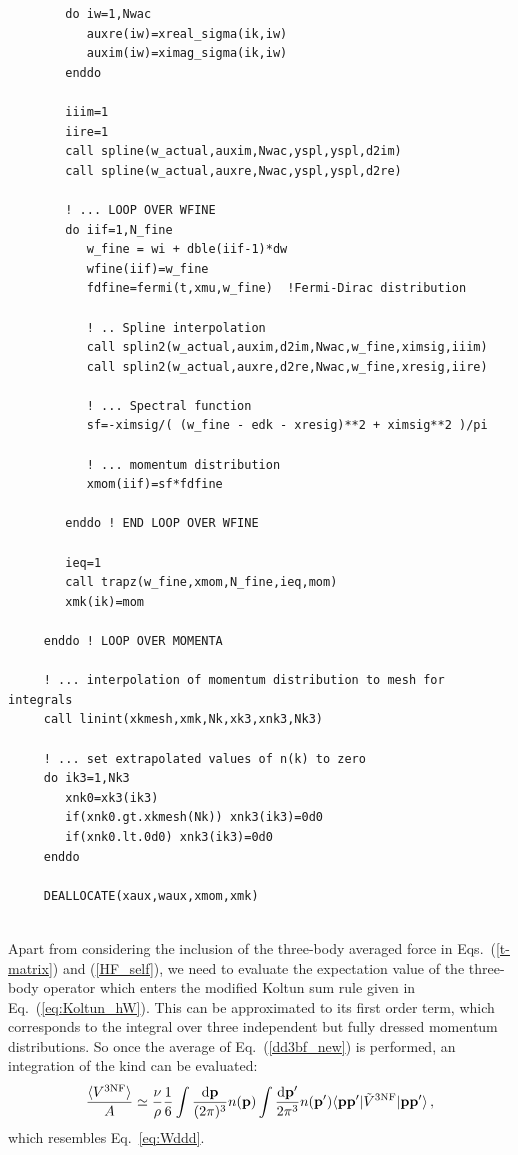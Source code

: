 \begin{lstlisting}
        do iw=1,Nwac
           auxre(iw)=xreal_sigma(ik,iw)
           auxim(iw)=ximag_sigma(ik,iw)
        enddo
           
        iiim=1
        iire=1
        call spline(w_actual,auxim,Nwac,yspl,yspl,d2im)
        call spline(w_actual,auxre,Nwac,yspl,yspl,d2re)
       
        ! ... LOOP OVER WFINE
        do iif=1,N_fine
           w_fine = wi + dble(iif-1)*dw  
           wfine(iif)=w_fine
           fdfine=fermi(t,xmu,w_fine)  !Fermi-Dirac distribution
              
           ! .. Spline interpolation
           call splin2(w_actual,auxim,d2im,Nwac,w_fine,ximsig,iiim)
           call splin2(w_actual,auxre,d2re,Nwac,w_fine,xresig,iire)
              
           ! ... Spectral function
           sf=-ximsig/( (w_fine - edk - xresig)**2 + ximsig**2 )/pi
              
           ! ... momentum distribution
           xmom(iif)=sf*fdfine
           
        enddo ! END LOOP OVER WFINE

        ieq=1
        call trapz(w_fine,xmom,N_fine,ieq,mom)
        xmk(ik)=mom

     enddo ! LOOP OVER MOMENTA
     
     ! ... interpolation of momentum distribution to mesh for integrals
     call linint(xkmesh,xmk,Nk,xk3,xnk3,Nk3)

     ! ... set extrapolated values of n(k) to zero
     do ik3=1,Nk3
        xnk0=xk3(ik3)
        if(xnk0.gt.xkmesh(Nk)) xnk3(ik3)=0d0
        if(xnk0.lt.0d0) xnk3(ik3)=0d0
     enddo

     DEALLOCATE(xaux,waux,xmom,xmk)
  
 \end{lstlisting}
 \vspace*{0.3cm}

Apart from considering the inclusion of the three-body averaged force in Eqs.~(\ref{t-matrix}) and (\ref{HF_self}), we need to evaluate the expectation value of the three-body operator which enters the modified Koltun sum rule given in Eq.~(\ref{eq:Koltun_hW}). This can be approximated to its first order term, which corresponds to the integral over three independent but fully dressed momentum distributions. So once the average of Eq.~(\ref{dd3bf_new}) is performed, an integration of the kind can be evaluated:
\begin{equation}
\frac{\langle V^\mathrm{3NF}\rangle}{A}\simeq\frac{\nu}{\rho}\frac{1}{6}\int \frac{{\rm d}{\bf p}}{(2\pi)^3}n({\bf p})\int\frac{{\rm d}{\bf p'}}{2\pi^3}n({\bf p'})\langle{\bf pp'}|\tilde V^{\rm 3NF}|{\bf pp'}\rangle\,,
\label{3B_exp}
\end{equation}
which resembles Eq.~\ref{eq:Wddd}.

